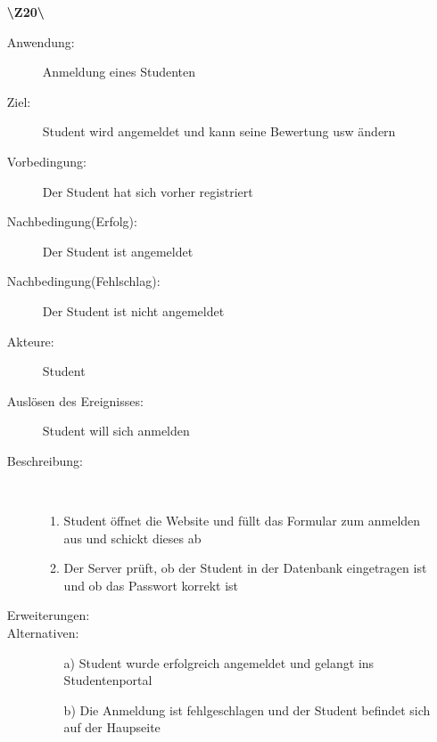 \documentclass[a4paper]{article}
\begin{document}
\begin{enumerate}
  \item[\textbf{\textbackslash Z20\textbackslash}] \begin{description}
  \item[Anwendung:] Anmeldung eines Studenten
  \item[Ziel:] Student wird angemeldet und kann seine Bewertung usw ändern
  	\item[Vorbedingung:] Der Student hat sich vorher registriert
  	\item[Nachbedingung(Erfolg):] Der Student ist angemeldet
  	\item[Nachbedingung(Fehlschlag):] Der Student ist nicht angemeldet
  	\item[Akteure:] Student
  	\item[Auslösen des Ereignisses:] Student will sich anmelden
  	\item[Beschreibung:]~
  	\begin{enumerate}[1.]
  	  \item Student öffnet die Website und füllt das Formular zum anmelden aus und schickt dieses ab
  	  \item Der Server prüft, ob der Student in der Datenbank eingetragen ist und ob das Passwort korrekt ist
  	\end{enumerate}
  	\item[Erweiterungen:]
  	\item[Alternativen:]
	\begin{enumerate}
  	  \item[a)] Student wurde erfolgreich angemeldet und gelangt ins Studentenportal
  	  \item[b)] Die Anmeldung ist fehlgeschlagen und der Student befindet sich auf der Haupseite
  	\end{enumerate}
  \end{description}
  \pagebreak
  

\end{enumerate}
\end{document}
